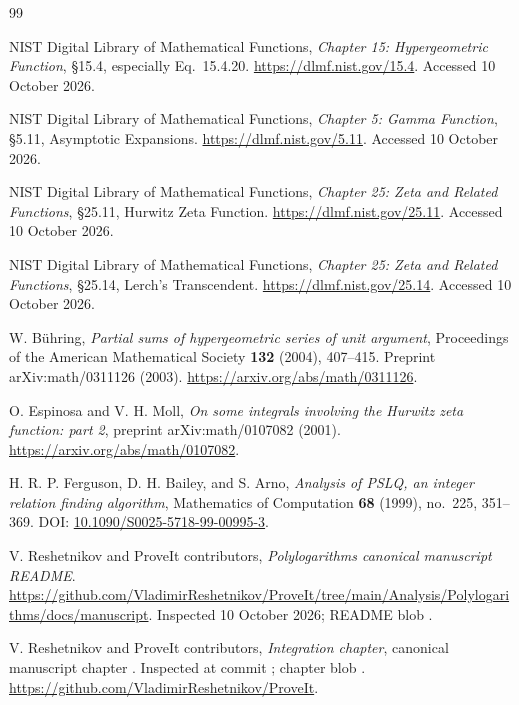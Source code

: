 \begin{thebibliography}{99}
\raggedright
{}
NIST Digital Library of Mathematical Functions,
\emph{Chapter 15: Hypergeometric Function}, \S15.4, especially Eq.~15.4.20.
\url{https://dlmf.nist.gov/15.4}. Accessed 10 October 2026.

NIST Digital Library of Mathematical Functions,
\emph{Chapter 5: Gamma Function}, \S5.11, Asymptotic Expansions.
\url{https://dlmf.nist.gov/5.11}. Accessed 10 October 2026.

NIST Digital Library of Mathematical Functions,
\emph{Chapter 25: Zeta and Related Functions}, \S25.11, Hurwitz Zeta Function.
\url{https://dlmf.nist.gov/25.11}. Accessed 10 October 2026.

NIST Digital Library of Mathematical Functions,
\emph{Chapter 25: Zeta and Related Functions}, \S25.14, Lerch's Transcendent.
\url{https://dlmf.nist.gov/25.14}. Accessed 10 October 2026.

W. B\"uhring,
\emph{Partial sums of hypergeometric series of unit argument},
Proceedings of the American Mathematical Society \textbf{132} (2004),
407--415. Preprint arXiv:math/0311126 (2003).
\url{https://arxiv.org/abs/math/0311126}.

O. Espinosa and V. H. Moll,
\emph{On some integrals involving the Hurwitz zeta function: part 2},
preprint arXiv:math/0107082 (2001).
\url{https://arxiv.org/abs/math/0107082}.

H. R. P. Ferguson, D. H. Bailey, and S. Arno,
\emph{Analysis of PSLQ, an integer relation finding algorithm},
Mathematics of Computation \textbf{68} (1999), no.~225, 351--369.
DOI: \href{https://doi.org/10.1090/S0025-5718-99-00995-3}{10.1090/S0025-5718-99-00995-3}.

V. Reshetnikov and ProveIt contributors,
\emph{Polylogarithms canonical manuscript README}.
\url{https://github.com/VladimirReshetnikov/ProveIt/tree/main/Analysis/Polylogarithms/docs/manuscript}.
Inspected 10 October 2026; README blob
.

V. Reshetnikov and ProveIt contributors,
\emph{Integration chapter},
canonical manuscript chapter .
Inspected at commit
;
chapter blob .
\url{https://github.com/VladimirReshetnikov/ProveIt}.
\end{thebibliography}

